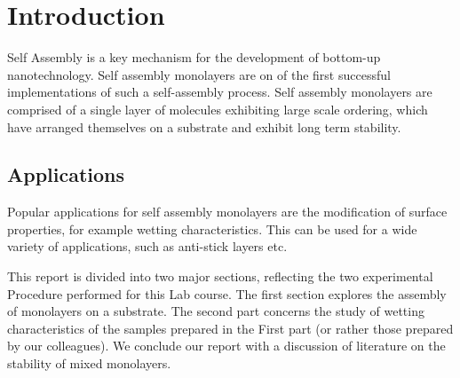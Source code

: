 \section{Introduction}


Self Assembly is a key mechanism for the development of bottom-up nanotechnology. Self assembly monolayers are on of the first successful implementations of such a self-assembly process. Self assembly monolayers are comprised of a single layer of molecules exhibiting large scale ordering, which have arranged themselves on a substrate and exhibit long term stability.

\subsection{Applications}

Popular applications for self assembly monolayers are the modification of surface properties, for example wetting characteristics. This can be used for a wide variety of applications, such as anti-stick layers etc.

This report is divided into two major sections, reflecting the two experimental Procedure performed for this Lab course. The first section explores the assembly of monolayers on a substrate. The second part concerns the study of wetting characteristics of the samples prepared in the First part (or rather those prepared by our colleagues). We conclude our report with a discussion of literature on the stability of mixed monolayers.